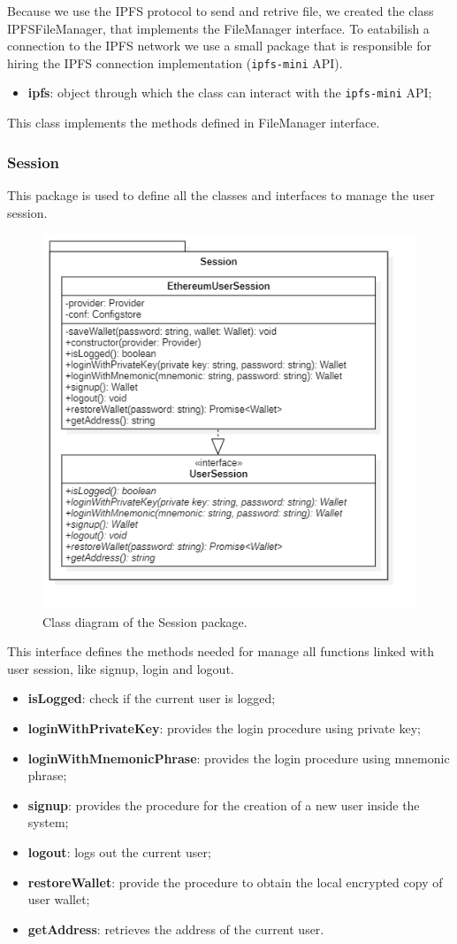 				Because we use the IPFS protocol to send and retrive file, we created the class IPFSFileManager, that implements the FileManager interface. To eatabilish a connection to the IPFS network we use a small package that is responsible for hiring the IPFS connection implementation (\texttt{ipfs-mini} API). 
				
				\begin{itemize}
					\item \textbf{ipfs}: object through which the class can interact with the \texttt{ipfs-mini} API;
				\end{itemize}
				
				This class implements the methods defined in FileManager interface. 
	
		\subsubsection{Session} 
		This package is used to define all the classes and interfaces to manage the user session.
		\begin{figure} [h!]
			\centering
			\includegraphics[width=0.5\linewidth]{diagrammi/etherless-cli/Session}
			\caption{Class diagram of the Session package.}
		\end{figure}
			
			This interface defines the methods needed for manage all functions linked with user session, like signup, login and logout. 
				\begin{itemize}
					\item \textbf{isLogged}: check if the current user is logged;
					\item \textbf{loginWithPrivateKey}: provides the login procedure using private key;
					\item \textbf{loginWithMnemonicPhrase}: provides the login procedure using mnemonic phrase;
					\item \textbf{signup}: provides the procedure for the creation of a new user inside the system;
					\item \textbf{logout}: logs out the current user;
					\item \textbf{restoreWallet}: provide the procedure to obtain the local encrypted copy of user wallet;
					\item \textbf{getAddress}: retrieves the address of the current user.
				\end{itemize}
			
